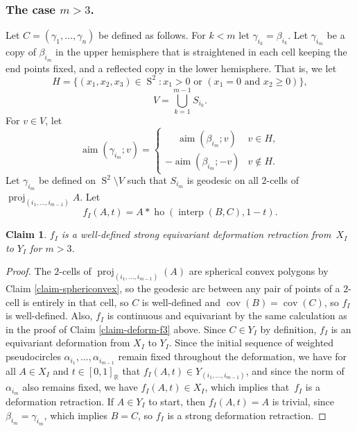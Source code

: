 \documentclass[11pt]{article}
\numberwithin{equation}{section}
\newtheorem{claim}[theorem]{Claim}
\theoremstyle{remark}
\let\mb\mathbb
\DeclareMathOperator{\sphere}{S}
\DeclareMathOperator{\aim}{aim}
\DeclareMathOperator{\proj}{proj}
\DeclareMathOperator{\interp}{interp}
\DeclareMathOperator{\ho}{ho}
\DeclareMathOperator{\cov}{cov}
\begin{document}
\subsubsection*{The case $m>3$.}
Let $C\!=\!(\gamma_1,\dots,\gamma_n)$ be defined as follows.
For $k\!<\!m$ let $\gamma_{i_k}\!=\!\beta_{i_k}$.
Let $\gamma_{i_m}$ be a copy of $\beta_{i_m}$ in the upper hemisphere that is straightened in each cell keeping the end points fixed, and a reflected copy in the lower hemisphere.
That is, we let
\[ H = \bigl\{(x_1,x_2,x_3) \in \sphere^2 :x_1 > 0 \text{ or } (x_1=0 \text{ and } x_2 \geq 0)\bigr\}, \]
\[ V = \bigcup_{k=1}^{m-1} S_{i_k}. \]
For $v \in V$, let
\[ \aim (\gamma_{i_m}; v) = \begin{cases}
\phantom{-}\aim (\beta_{i_m}; v) & v \in H, \\
{-}\aim (\beta_{i_m}; -v) & v \not\in H.
\end{cases}\]
Let $\gamma_{i_m}$ be defined on $\sphere^2 \setminus V$ such that $S_{i_m}$ is geodesic on all $2$-cells of $\proj_{(i_1,\dots,i_{m-1})} A$.
Let
\[ f_{I}(A,t) = A*\ho(\interp(B,C),1-t).\]

\begin{claim}\label{claim-deform-f}
$f_I$ is a well-defined strong equivariant deformation retraction from~$X_I$ to $Y_I$ for $m>3$.
\end{claim}

\begin{proof}
The $2$-cells of $\proj_{(i_1,\dots,i_{m-1})}(A)$ are spherical convex polygons by Claim \ref{claim-sphericonvex}, so the geodesic arc between any pair of points of a $2$-cell is entire\-ly in that cell, so $C$ is well-defined and $\cov(B)=\cov(C)$, so $f_I$ is well-defined.
Also, $f_I$ is continuous and equivariant by the same calculation as in the proof of Claim \ref{claim-deform-f3} above.
Since $C \in Y_I$ by definition, $f_I$ is an equivariant deformation from $X_I$ to $Y_I$.
Since the initial sequence of weighted pseudocircles $\alpha_{i_1},\dots,\alpha_{i_{m-1}}$ remain fixed throughout the deformation, we have for all $A \in X_I$ and $t \in [0,1]_\mb{R}$ that $f_I(A,t) \in Y_{(i_1,\dots,i_{m-1})}$, and since the norm of $\alpha_{i_m}$ also remains fixed, we have $f_I(A,t) \in X_I$, which implies that~$f_I$ is a deformation retraction.
If $A \in Y_I$ to start, then $f_I(A,t) = A$ is trivial, since $\beta_{i_m} = \gamma_{i_m}$, which implies $B=C$, so $f_I$ is a strong deformation retraction.
\end{proof}
\end{document}
